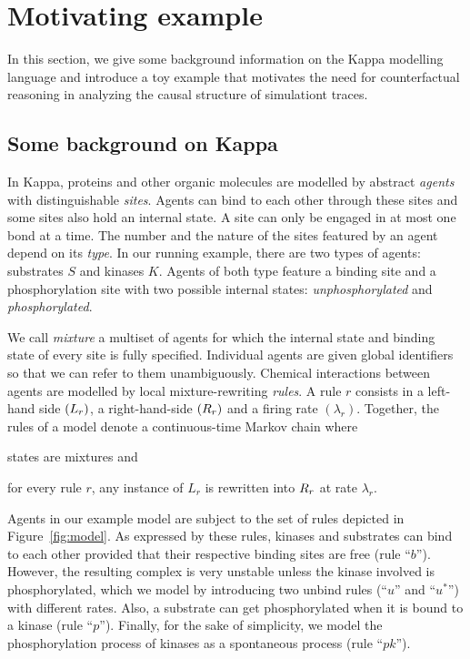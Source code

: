 \pagebreak

\section{Motivating example}\label{sec:example}


In this section, we give some background information on the Kappa
modelling language and introduce a toy example that motivates the need
for counterfactual reasoning in analyzing the causal structure of
simulationt traces.


\subsection{Some background on Kappa}

In Kappa, proteins and other organic molecules are modelled by
abstract \emph{agents} with distinguishable \emph{sites}. Agents can
bind to each other through these sites and some sites also hold an
internal state. A site can only be engaged in at most one bond at a
time. The number and the nature of the sites featured by an agent
depend on its \emph{type}.
In our running example, there are two types of agents: substrates $S$
and kinases $K$. Agents of both type feature a binding site and a
phosphorylation site with two possible internal states:
\emph{unphosphorylated} and \emph{phosphorylated}.

We call \emph{mixture} a multiset of agents for which the internal
state and binding state of every site is fully specified.  Individual
agents are given global identifiers so that we can refer to them
unambiguously. 
\noindent
Chemical interactions between agents are modelled by local
mixture-rewriting \emph{rules}.  A rule $r$ consists in a left-hand
side $(L_{r})$, a right-hand-side $(R_{r})$ and a firing rate
$(\lambda_r)$.  Together, the rules of a model denote a
continuous-time Markov chain where
\begin{inparaenum}[i)]
\item states are mixtures and
\item for every rule $r$, any instance of $L_r$ is rewritten into
  $R_{r}$ at rate $\lambda_r$.
\end{inparaenum}
Agents in our example model are subject to the set of rules depicted
in Figure~\ref{fig:model}. As expressed by these rules, kinases and
substrates can bind to each other provided that their respective
binding sites are free (rule ``$b$''). However, the resulting complex
is very unstable unless the kinase involved is phosphorylated, which
we model by introducing two unbind rules (``$u$'' and ``$u^{*}$'')
with different rates. Also, a substrate can get phosphorylated when it
is bound to a kinase (rule ``$p$''). Finally, for the sake of
simplicity, we model the phosphorylation process of kinases as a
spontaneous process (rule ``$pk$'').

